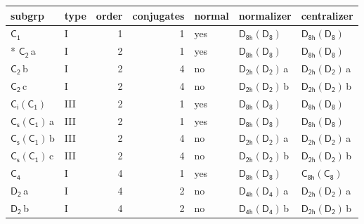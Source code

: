 \documentclass[10pt,a4paper]{article}
\numberwithin{equation}{section}
\newcommand{\grp}[1]{\mathsf{#1}}
\newcommand{\clsletter}[1]{\,{\scriptsize\color{black!55}#1}}
\begin{document}
{\small\begin{longtable}{@{}llrrlll@{}}\toprule
subgrp & type & order & conjugates & normal & normalizer & centralizer\\\midrule\endhead
\bottomrule\endfoot\endlastfoot
\href{../../../rotation/data/pdf/C1.pdf}{$\grp{C_{1}}$} & I & 1 & 1 & yes & \href{D8h-D8.pdf}{$\grp{D_{8h}}(\grp{D_{8}})$} & \href{D8h-D8.pdf}{$\grp{D_{8h}}(\grp{D_{8}})$}\\*
\href{../../../rotation/data/pdf/C2.pdf}{$\grp{C_{2}}$}\clsletter{a} & I & 2 & 1 & yes & \href{D8h-D8.pdf}{$\grp{D_{8h}}(\grp{D_{8}})$} & \href{D8h-D8.pdf}{$\grp{D_{8h}}(\grp{D_{8}})$}\\
\href{../../../rotation/data/pdf/C2.pdf}{$\grp{C_{2}}$}\clsletter{b} & I & 2 & 4 & no & \href{D2h-D2.pdf}{$\grp{D_{2h}}(\grp{D_{2}})$}\clsletter{a} & \href{D2h-D2.pdf}{$\grp{D_{2h}}(\grp{D_{2}})$}\clsletter{a}\\
\href{../../../rotation/data/pdf/C2.pdf}{$\grp{C_{2}}$}\clsletter{c} & I & 2 & 4 & no & \href{D2h-D2.pdf}{$\grp{D_{2h}}(\grp{D_{2}})$}\clsletter{b} & \href{D2h-D2.pdf}{$\grp{D_{2h}}(\grp{D_{2}})$}\clsletter{b}\\
\href{S2-C1.pdf}{$\grp{C_{i}}(\grp{C_{1}})$} & III & 2 & 1 & yes & \href{D8h-D8.pdf}{$\grp{D_{8h}}(\grp{D_{8}})$} & \href{D8h-D8.pdf}{$\grp{D_{8h}}(\grp{D_{8}})$}\\
\href{C1v-C1.pdf}{$\grp{C_{s}}(\grp{C_{1}})$}\clsletter{a} & III & 2 & 1 & yes & \href{D8h-D8.pdf}{$\grp{D_{8h}}(\grp{D_{8}})$} & \href{D8h-D8.pdf}{$\grp{D_{8h}}(\grp{D_{8}})$}\\
\href{C1v-C1.pdf}{$\grp{C_{s}}(\grp{C_{1}})$}\clsletter{b} & III & 2 & 4 & no & \href{D2h-D2.pdf}{$\grp{D_{2h}}(\grp{D_{2}})$}\clsletter{a} & \href{D2h-D2.pdf}{$\grp{D_{2h}}(\grp{D_{2}})$}\clsletter{a}\\
\href{C1v-C1.pdf}{$\grp{C_{s}}(\grp{C_{1}})$}\clsletter{c} & III & 2 & 4 & no & \href{D2h-D2.pdf}{$\grp{D_{2h}}(\grp{D_{2}})$}\clsletter{b} & \href{D2h-D2.pdf}{$\grp{D_{2h}}(\grp{D_{2}})$}\clsletter{b}\\
\href{../../../rotation/data/pdf/C4.pdf}{$\grp{C_{4}}$} & I & 4 & 1 & yes & \href{D8h-D8.pdf}{$\grp{D_{8h}}(\grp{D_{8}})$} & \href{C8h-C8.pdf}{$\grp{C_{8h}}(\grp{C_{8}})$}\\
\href{../../../rotation/data/pdf/D2.pdf}{$\grp{D_{2}}$}\clsletter{a} & I & 4 & 2 & no & \href{D4h-D4.pdf}{$\grp{D_{4h}}(\grp{D_{4}})$}\clsletter{a} & \href{D2h-D2.pdf}{$\grp{D_{2h}}(\grp{D_{2}})$}\clsletter{a}\\
\href{../../../rotation/data/pdf/D2.pdf}{$\grp{D_{2}}$}\clsletter{b} & I & 4 & 2 & no & \href{D4h-D4.pdf}{$\grp{D_{4h}}(\grp{D_{4}})$}\clsletter{b} & \href{D2h-D2.pdf}{$\grp{D_{2h}}(\grp{D_{2}})$}\clsletter{b}\\

\end{longtable}}
\end{document}

